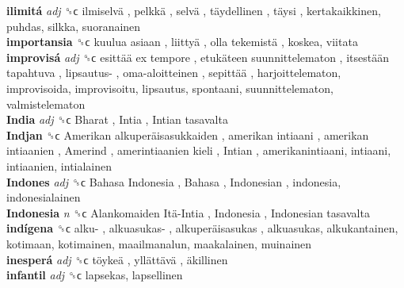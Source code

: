 \textbf{ilimitá} \emph{adj}  ␝ϲ   ilmiselvä ,  pelkkä ,  selvä ,  täydellinen ,  täysi , kertakaikkinen, puhdas, silkka, suoranainen  \\
\textbf{importansia} ␝ϲ   kuulua asiaan ,  liittyä ,  olla tekemistä , koskea, viitata  \\
\textbf{improvisá} \emph{adj}  ␝ϲ   esittää ex tempore ,  etukäteen suunnittelematon ,  itsestään tapahtuva ,  lipsautus- ,  oma-aloitteinen ,  sepittää , harjoittelematon, improvisoida, improvisoitu, lipsautus, spontaani, suunnittelematon, valmistelematon  \\
\textbf{India} \emph{adj}  ␝ϲ   Bharat ,  Intia ,  Intian tasavalta   \\
\textbf{Indjan} ␝ϲ   Amerikan alkuperäisasukkaiden ,  amerikan intiaani ,  amerikan intiaanien ,  Amerind ,  amerintiaanien kieli ,  Intian , amerikanintiaani, intiaani, intiaanien, intialainen  \\
\textbf{Indones} \emph{adj}  ␝ϲ   Bahasa Indonesia ,  Bahasa ,  Indonesian , indonesia, indonesialainen  \\
\textbf{Indonesia} \emph{n}  ␝ϲ   Alankomaiden Itä-Intia ,  Indonesia ,  Indonesian tasavalta   \\
\textbf{indígena} ␝ϲ   alku- ,  alkuasukas- ,  alkuperäisasukas , alkuasukas, alkukantainen, kotimaan, kotimainen, maailmanalun, maakalainen, muinainen  \\
\textbf{inesperá} \emph{adj}  ␝ϲ   töykeä ,  yllättävä ,  äkillinen   \\
\textbf{infantil} \emph{adj}  ␝ϲ  lapsekas, lapsellinen  \\
